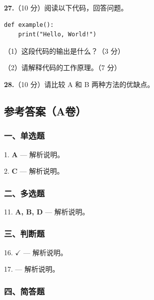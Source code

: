 \documentclass[11pt,a4paper]{article}
\newcommand{\answerlines}[1]{%
  \par\vspace{\dimexpr #1\baselineskip + 0.5em\relax}%
}
\begin{document}
\noindent\textbf{27.}（10 分）阅读以下代码，回答问题。

\begin{lstlisting}
def example():
    print("Hello, World!")
\end{lstlisting}

\par\noindent（1）这段代码的输出是什么？（3 分）
\answerlines{3}

\par\noindent（2）请解释代码的工作原理。（7 分）
\answerlines{6}

\noindent\textbf{28.}（10 分）请比较 A 和 B 两种方法的优缺点。

\answerlines{10}

\label{exam:last}

\newpage
\setcounter{page}{1}

\subsection*{参考答案（A卷）}

\subsubsection*{一、单选题}
1. \textbf{A} — 解析说明。

2. \textbf{C} — 解析说明。


\subsubsection*{二、多选题}
11. \textbf{A, B, D} — 解析说明。


\subsubsection*{三、判断题}
16. \textbf{$\checkmark$} — 解析说明。

17. \textbf{} — 解析说明。


\subsubsection*{四、简答题}
\end{document}
